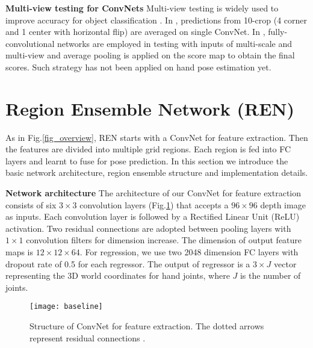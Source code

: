 \documentclass{article}
\begin{document}
\noindent\textbf{Multi-view testing for ConvNets}\hspace{2mm}
Multi-view testing is widely used to improve accuracy for object classification \cite{krizhevsky2012imagenet}. In \cite{krizhevsky2012imagenet}, predictions from 10-crop (4 corner and 1 center with horizontal flip) are averaged on single ConvNet. In \cite{sermanet2013overfeat}, fully-convolutional networks are employed in testing with inputs of multi-scale and multi-view and average pooling is applied on the score map to obtain the final scores. Such strategy has not been applied on hand pose estimation yet.

\section{Region Ensemble Network (REN)}
As in Fig.\ref{fig_overview}, REN starts with a ConvNet for feature extraction. Then the features are divided into multiple grid regions. Each region is fed into FC layers and learnt to fuse for pose prediction. In this section we introduce the basic network architecture, region ensemble structure and implementation details.

\noindent\textbf{Network architecture}\hspace{2mm} The architecture of our ConvNet for feature extraction consists of six $3\times3$ convolution layers (Fig.\ref{fig_baseline}) that accepts a $96\times96$ depth image as inputs. Each convolution layer is followed by a Rectified Linear Unit (ReLU) activation. Two residual connections \cite{he2015deep} are adopted between pooling layers with $1\times1$ convolution filters for dimension increase. The dimension of output feature maps is $12\times12\times64$. For regression, we use two 2048 dimension FC layers with dropout rate of 0.5 for each regressor. The output of regressor is a $3\times J$ vector representing the 3D world coordinates for hand joints, where $J$ is the number of joints.

\begin{figure}[htb]
\centering
{\texttt{[image: baseline]}}
\caption{Structure of ConvNet for feature extraction. The dotted arrows represent residual connections \cite{he2015deep}.}
\label{fig_baseline}
\end{figure}
\end{document}
